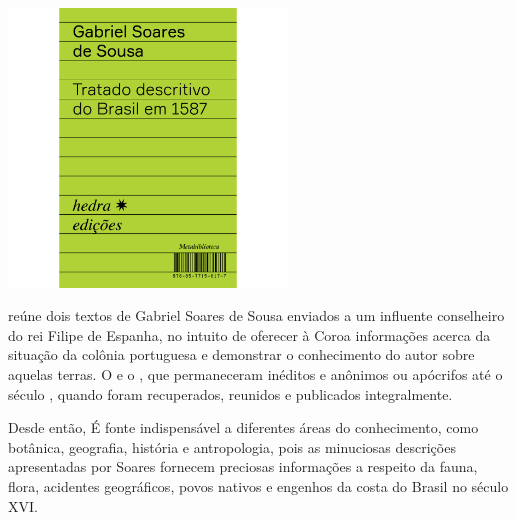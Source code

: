 \pagebreak

\begin{center}
\hspace*{-3.6cm}
\hspace*{3.1cm}\includegraphics[width=74mm]{./grid/tratado.png}
\end{center}

\hspace*{-7cm}\hrulefill\hspace*{-7cm}

\medskip

 reúne dois textos de
Gabriel Soares de Sousa enviados a um influente conselheiro do rei
Filipe  de Espanha, no intuito de oferecer à Coroa informações acerca
da situação da colônia portuguesa e demonstrar o conhecimento do autor
sobre aquelas terras.  O {} e o {}, que permaneceram
inéditos e anônimos ou apócrifos até o século , quando foram
recuperados, reunidos e publicados integralmente.

Desde então,  É fonte indispensável a
diferentes áreas do conhecimento, como botânica, geografia, história e
antropologia, pois as minuciosas descrições apresentadas por Soares
fornecem preciosas informações a respeito da fauna, flora, acidentes
geográficos, povos nativos e engenhos da costa do Brasil no
século XVI.

